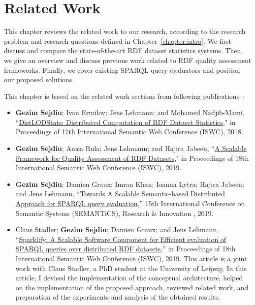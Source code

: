 \chapter{Related Work}
\label{chapter:related}

This chapter reviews the related work to our research, according to the research problem and research questions defined in Chapter~\ref{chapter:intro}.
We first discuss and compare the state-of-the-art \gls{RDF} dataset statistics systems.
Then, we give an overview and discuss previous work related to \gls{RDF} quality assessment frameworks. 
Finally, we cover existing \gls{SPARQL} query evaluators and position our proposed solutions. 

This chapter is based on the related work sections from following publications~\cite{sejdiu-2018-dist-lod-stats-iswc,sejdiu-2019-sansa-dist-quality-assessment-iswc,sejdiu-2019-sansa-semantic-based-semantics, 2019-sansa-sparklify-iswc}:

\begin{itemize}
    \item \textbf{Gezim Sejdiu}; Ivan Ermilov; Jens Lehmann; and Mohamed Nadjib-Mami, “\href{http://jens-lehmann.org/files/2018/iswc_distlodstats.pdf}{DistLODStats: Distributed Computation of RDF Dataset Statistics}," in Proceedings of 17th International Semantic Web Conference (ISWC), 2018.

    \item \textbf{Gezim Sejdiu}; Anisa Rula; Jens Lehmann; and Hajira Jabeen, “\href{http://jens-lehmann.org/files/2019/iswc_dist_quality_assessment.pdf}{A Scalable Framework for Quality Assessment of RDF Datasets}," in Proceedings of 18th International Semantic Web Conference (ISWC), 2019.

    \item \textbf{Gezim Sejdiu}; Damien Graux; Imran Khan; Ioanna Lytra; Hajira Jabeen; and Jens Lehmann, “\href{https://gezimsejdiu.github.io/publications/semantic_based_query_paper_SEMANTICS2019.pdf}{Towards A Scalable Semantic-based Distributed Approach for SPARQL query evaluation},” 15th International Conference on Semantic Systems (SEMANTiCS), Research \& Innovation , 2019.

    \item Claus Stadler; \textbf{Gezim Sejdiu}; Damien Graux; and Jens Lehmann, “\href{http://jens-lehmann.org/files/2019/iswc_sparklify.pdf}{Sparklify: A Scalable Software Component for Efficient evaluation of SPARQL queries over distributed RDF datasets},” in Proceedings of 18th International Semantic Web Conference (ISWC), 2019.
    This article is a joint work with Claus Stadler, a PhD student at the University of Leipzig. 
    In this article, I devised the implementation of the conceptual architecture, helped on the implementation of the proposed approach, reviewed related work, and preparation of the experiments and analysis of the obtained results.
    
\end{itemize}

